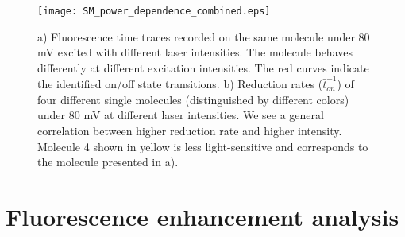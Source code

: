\documentclass[11pt,a4paper,onecolumn]{article}
\begin{document}
\begin{figure}
  \centering
  \texttt{[image: SM\_power\_dependence\_combined.eps]}
	\makeatletter
	\renewcommand{\fnum@figure}{\figurename~S\thefigure}
	\makeatother
  \caption{a) Fluorescence time traces recorded on the same molecule under 80 mV excited with different laser intensities. The molecule behaves differently at different excitation intensities. The red curves indicate the identified on/off state transitions. b) Reduction rates ($\bar{t}_{on}^{-1}$) of four different single molecules (distinguished by different colors) under 80 mV at different laser intensities. We see a general correlation between higher reduction rate and higher intensity. Molecule 4 shown in yellow is less light-sensitive and corresponds to the molecule presented in a).
	}
  \label{fg:SM_power_dep}
\end{figure}


\section{Fluorescence enhancement analysis}
\end{document}
